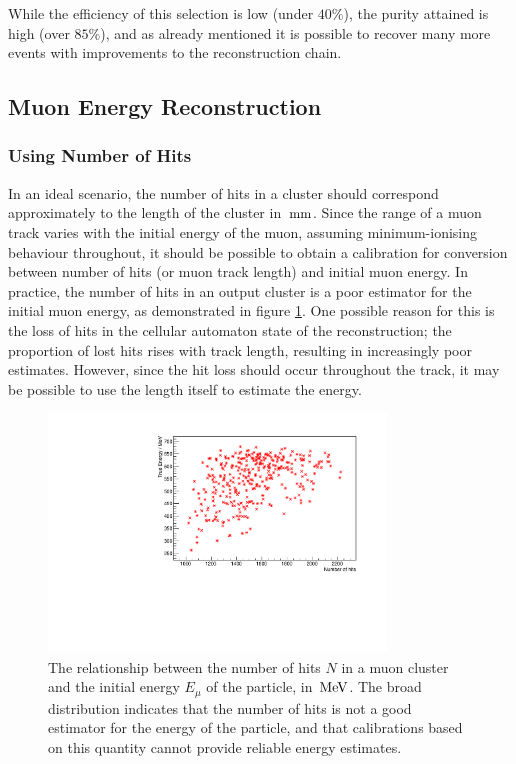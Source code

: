 While the efficiency of this selection is low (under $40\%$), the purity attained is high (over $85\%$), and as already mentioned it is possible to recover many more events with improvements to the reconstruction chain.

\subsection{Muon Energy Reconstruction}
\subsubsection{Using Number of Hits}
In an ideal scenario, the number of hits in a cluster should correspond approximately to the length of the cluster in $\,\mathrm{mm}$. Since the range of a muon track varies with the initial energy of the muon, assuming minimum-ionising behaviour throughout, it should be possible to obtain a calibration for conversion between number of hits (or muon track length) and initial muon energy. In practice, the number of hits in an output cluster is a poor estimator for the initial muon energy, as demonstrated in figure \ref{fig:ccqe-770-e-nhits-calib}. One possible reason for this is the loss of hits in the cellular automaton state of the reconstruction; the proportion of lost hits rises with track length, resulting in increasingly poor estimates. However, since the hit loss should occur throughout the track, it may be possible to use the length itself to estimate the energy.

\begin{figure}
    \centering
    \includegraphics[angle=-90,width=0.8\textwidth]{chapters/analysis_images/ccqe-770-e-nhits-calib}
    \caption[Relationship between number of hits and energy]{\label{fig:ccqe-770-e-nhits-calib}The relationship between the number of hits $N$ in a muon cluster and the initial energy $E_\mu$ of the particle, in $\,\mathrm{MeV}$. The broad distribution indicates that the number of hits is not a good estimator for the energy of the particle, and that calibrations based on this quantity cannot provide reliable energy estimates.}
\end{figure}

